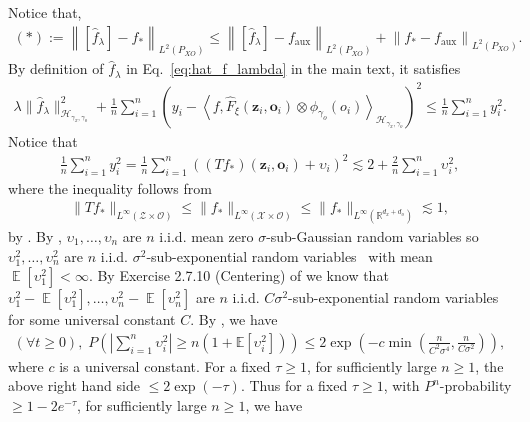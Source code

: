 \documentclass[11pt]{article}
\newcommand{\bz}{\mathbf z}
\newcommand{\bo}{\mathbf o}
\newcommand{\calZ}{\mathcal{Z}}
\newcommand{\calH}{\mathcal{H}}
\newcommand{\calO}{\mathcal{O}}
\newcommand{\calX}{\mathcal{X}}
\newcommand{\0}{\mathbf{0}}
\DeclareMathOperator{\E}{\mathbb{E}}
\begin{document}
\begin{appendix}
Notice that,
\begin{align}
\label{eq:appendix_ast_triangular}
    (\ast) := \left\|\left[\hat{f}_{\lambda}\right] - f_{\ast}\right\|_{L^2(P_{XO})} \leq \left\|\left[\hat{f}_{\lambda}\right] - f_{\mathrm{aux}} \right\|_{L^2(P_{XO})} + \left\|f_\ast - f_{\mathrm{aux}} \right\|_{L^2(P_{XO})} .
\end{align}
By definition of $\hat{f}_{\lambda}$ in Eq.~\eqref{eq:hat_f_lambda} in the main text, it satisfies 
\begin{align}\label{eq:trivial_bound}
    \lambda \|\hat{f}_{\lambda}\|_{\calH_{\gamma_x,\gamma_o}}^2 + \frac{1}{n}\sum_{i=1}^n \left(y_i - \left\langle f, \hat{F}_{\xi}(\bz_i,\bo_i) \otimes \phi_{\gamma_o}(o_i) \right\rangle_{\calH_{\gamma_x,\gamma_o}} \right)^2 \leq \frac{1}{n}\sum_{i=1}^n y_i^2.
\end{align}
Notice that
\begin{align*}
    \frac{1}{n}\sum_{i=1}^{n}y_i^2 = \frac{1}{n}\sum_{i=1}^{n}((Tf_{\ast})(\bz_i, \bo_i) + \upsilon_i)^2  \lesssim 2 + \frac{2}{n}\sum_{i=1}^{n}\upsilon_i^2,
\end{align*}
where the inequality follows from 
\begin{align*}
    \|Tf_{\ast}\|_{L^{\infty}(\calZ\times \calO)}\leq \|f_{\ast}\|_{L^{\infty}(\calX\times \calO)} \leq \|f_{\ast}\|_{L^{\infty}(\mathbb{R}^{d_x+d_o})} \lesssim 1,
\end{align*}
by . By , $\upsilon_1, \ldots, \upsilon_n$ are $n$ i.i.d. mean zero $\sigma$-sub-Gaussian random variables so $\upsilon_1^2, \ldots, \upsilon_n^2$ are $n$ i.i.d. $\sigma^2$-sub-exponential random variables~\citep[Lemma 2.7.6]{vershynin2018high} with mean $\E[\upsilon_1^2] < \infty$. By Exercise 2.7.10 (Centering) of \cite{vershynin2018high} we know that $\upsilon_1^2 - \E[\upsilon_1^2], \ldots, \upsilon_n^2 - \E[\upsilon_n^2]$ are $n$ i.i.d. $C\sigma^2$-sub-exponential random variables for some universal constant $C$. By \citet[Theorem 2.8.1 (Bernstein's inequality)]{vershynin2018high}, we have
\begin{align*}
    (\forall t\geq 0), \;P\left(\left|\sum_{i=1}^{n}\upsilon_i^2\right| \geq n\left(1+\mathbb{E}\left[\upsilon_i^2\right]\right)\right) \leq 2\exp\left(-c\min\left(\frac{n}{C^2\sigma^4}, \frac{n}{C\sigma^2}\right)\right),
\end{align*}
where $c$ is a universal constant. For a fixed $\tau\geq 1$, for sufficiently large $n\geq 1$, the above right hand side $\leq 2\exp(-\tau)$. Thus for a fixed $\tau\geq 1$, with $P^n$-probability $\geq 1 - 2e^{-\tau}$, for sufficiently large $n\geq 1$, we have

\end{appendix}
\end{document}
